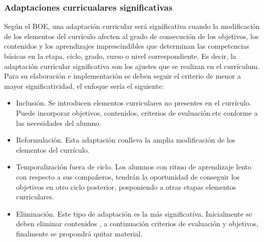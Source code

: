 \subsubsection{Adaptaciones curricualares significativas}
Según el BOE, una adaptación curricular será significativa cuando la modificación de los elementos del currículo afecten al grado de consecución de los objetivos, los contenidos y los aprendizajes imprescindibles que determinan las competencias básicas en la etapa, ciclo, grado, curso o nivel correspondiente. 
Es decir, la adaptación curricular significativa son los ajustes que se realizan en el currículum. Para su elaboración e implementación se deben seguir el criterio de menor a mayor significatividad, el enfoque sería el siguiente:
\begin{itemize}
    \item Inclusión. Se introducen elementos curriculares no presentes en el currículo. Puede incorporar objetivos, contenidos, criterios de evaluación.etc conforme a las necesidades del alumno.
    \item Reformulación. Esta adaptación conlleva la amplia modificación de los elementos del currículo.
    \item Temporalización fuera de ciclo. Los alumnos con ritmo de aprendizaje lento con respecto a sus compañeros, tendrán la oportunidad de conseguir los objetivos en otro ciclo posterior, posponiendo a otras etapas elementos curriculares.
    \item Eliminación. Este tipo de adaptación es la más significativa. Inicialmente se deben eliminar contenidos , a continuación criterios de evaluación y objetivos, finalmente se propondrá quitar material.
\end{itemize}

